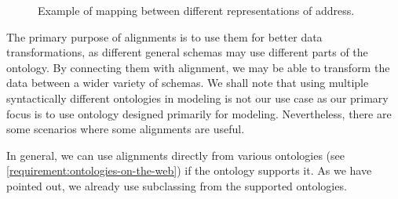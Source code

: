 \begin{figure}[h!]\centering
  \centering
  \caption{Example of mapping between different representations of address.}
  \label{figure:address-mapping}
\end{figure}

\medskip

The primary purpose of alignments is to use them for better data transformations, as different general schemas may use different parts of the ontology. By connecting them with alignment, we may be able to transform the data between a wider variety of schemas. We shall note that using multiple syntactically different ontologies in modeling is not our use case as our primary focus is to use ontology designed primarily for modeling. Nevertheless, there are some scenarios where some alignments are useful.

In general, we can use alignments directly from various ontologies (see \autoref{requirement:ontologies-on-the-web}) if the ontology supports it. As we have pointed out, we already use subclassing from the supported ontologies.

